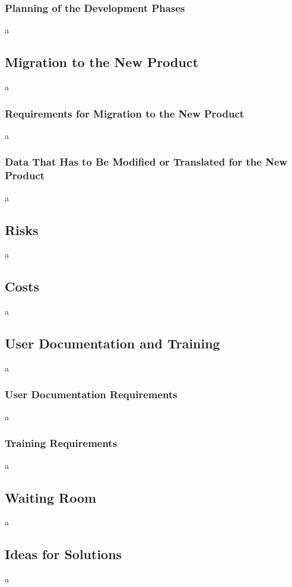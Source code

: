 \documentclass[12pt]{article}
\begin{document}
\subsubsection{Planning of the Development Phases}
a

\subsection{Migration to the New Product}
a

\subsubsection{Requirements for Migration to the New Product}
a

\subsubsection{Data That Has to Be Modified or Translated for the New Product}
a

\subsection{Risks}
a

\subsection{Costs}
a

\subsection{User Documentation and Training}
a

\subsubsection{User Documentation Requirements}
a

\subsubsection{Training Requirements}
a

\subsection{Waiting Room}
a

\subsection{Ideas for Solutions}
a
\end{document}
